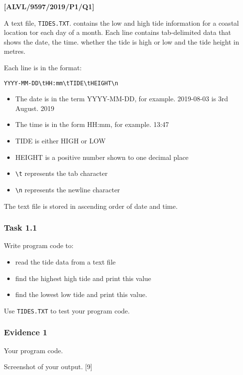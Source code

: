\item \textbf{{[}ALVL/9597/2019/P1/Q1{]} }

A text file, \texttt{TIDES.TXT}. contains the low and high tide information
for a coastal location tor each day of a month. Each line contains
tab-delimited data that shows the date, the time. whether the tide
is high or low and the tide height in metres. 

Each line is in the format: 
\begin{center}
\texttt{YYYY-MM-DD\textbackslash tHH:mm\textbackslash tTIDE\textbackslash tHEIGHT\textbackslash n }
\par\end{center}
\begin{itemize}
\item The date is in the term YYYY-MM-DD, for example. 2019-08-03 is 3rd
August. 2019 
\item The time is in the form HH:mm, for example. 13:47 
\item TIDE is either HIGH or LOW 
\item HEIGHT is a positive number shown to one decimal place 
\item \texttt{\textbackslash t} represents the tab character
\item \texttt{\textbackslash n} represents the newline character 
\end{itemize}
The text file is stored in ascending order of date and time.

\subsubsection*{Task 1.1}

Write program code to:
\begin{itemize}
\item read the tide data from a text file
\item find the highest high tide and print this value
\item find the lowest low tide and print this value.
\end{itemize}
Use \texttt{TIDES.TXT} to test your program code.

\subsubsection*{Evidence 1}

Your program code.

Screenshot of your output. \hfill{}{[}9{]} 

